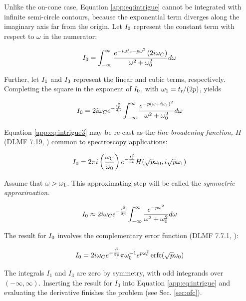 \documentclass[amsmath,amssymb,aps,prd,10pt,twocolumn]{revtex4}
\DeclareMathOperator\erfc{erfc}
\begin{document}
Unlike the on-cone case, Equation \ref{app:eq:intrigue} cannot be integrated with infinite semi-circle contours, because the exponential term diverges along the imaginary axis far from the origin.  Let $I_{\rm 0}$ represent the constant term with respect to $\omega$ in the numerator:

\begin{equation}
I_{\rm 0} = \int_{-\infty}^{\infty} \frac{e^{-i \omega t_r - p\omega^2}  \left( 2 i \omega_C \right)}{\omega^2+\omega_0^2}d\omega \label{app:eq:intrigue2}
\end{equation}

Further, let $I_{\rm 1}$ and $I_{\rm 3}$ represent the linear and cubic terms, respectively.  Completing the square in the exponent of $I_{\rm 0}$, with $\omega_{\rm 1} = t_{\rm r}/(2p)$, yields

\begin{equation}
I_{\rm 0} = 2 i \omega_C e^{- \frac{t_{\rm r}^2}{4p}} \int_{-\infty}^{\infty} \frac{e^{-p(\omega + i\omega_{\rm 1})^2}}{\omega^2+\omega_0^2}d\omega \label{app:eq:intrigue3}
\end{equation}

Equation \ref{app:eq:intrigue3} may be re-cast as the \textit{line-broadening function, $H$} (DLMF 7.19, \cite{NIST:DLMF}) common to spectroscopy applications:

\begin{equation}
I_{\rm 0} = 2 \pi i \left( \frac{\omega_{\rm C}}{\omega_{\rm 0}} \right) e^{- \frac{t_{\rm r}^2}{4p}} H(\sqrt{p}\omega_0,i\sqrt{p}\omega_1)
\end{equation}

Assume that $\omega > \omega_{\rm 1}$.  This approximating step will be called the \textit{symmetric approximation.}

\begin{equation}
I_{\rm 0} \approx 2 i \omega_C e^{- \frac{t_{\rm}^2}{2p}} \int_{-\infty}^{\infty} \frac{e^{-p\omega^2}}{\omega^2+\omega_0^2}d\omega \label{app:eq:intrigue4}
\end{equation}

The result for $I_{\rm 0}$ involves the complementary error function (DLMF 7.7.1, \cite{NIST:DLMF}):

\begin{equation}
I_{\rm 0} = 2 i \omega_C e^{- \frac{t_{\rm}^2}{2p}} \pi \omega_{\rm 0}^{-1} e^{p \omega_{\rm 0}^2} \erfc(\sqrt{p} \omega_{\rm 0}) \label{app:eq:intrigue5}
\end{equation}

The integrals $I_1$ and $I_3$ are zero by symmetry, with odd integrands over $(-\infty,\infty)$.  Inserting the result for $I_0$ into Equation \ref{app:eq:intrigue} and evaluating the derivative finishes the problem (see Sec. \ref{sec:ofc}).


\end{document}
